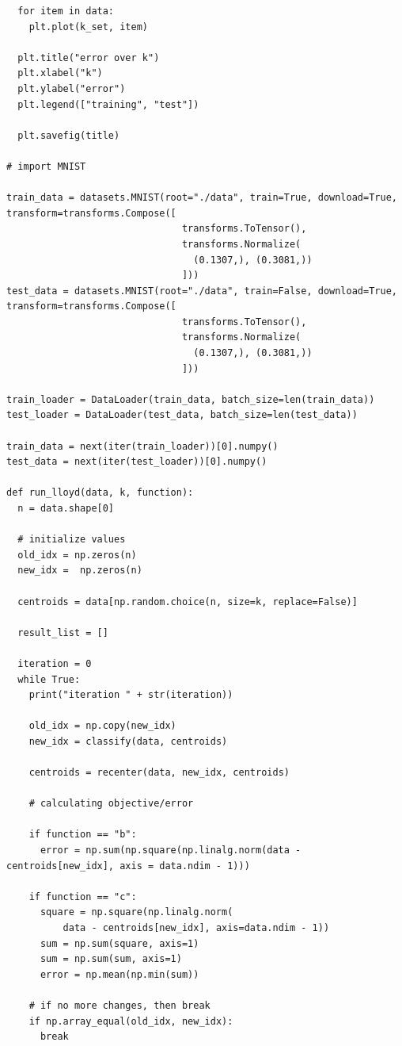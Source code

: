 \documentclass{article}
\newcommand{\1}{\mathbf{1}}
\begin{document}
{\begin{verbatim}
  for item in data:
    plt.plot(k_set, item)

  plt.title("error over k")
  plt.xlabel("k")
  plt.ylabel("error")
  plt.legend(["training", "test"])

  plt.savefig(title)

# import MNIST

train_data = datasets.MNIST(root="./data", train=True, download=True, transform=transforms.Compose([
                               transforms.ToTensor(),
                               transforms.Normalize(
                                 (0.1307,), (0.3081,))
                               ]))
test_data = datasets.MNIST(root="./data", train=False, download=True, transform=transforms.Compose([
                               transforms.ToTensor(),
                               transforms.Normalize(
                                 (0.1307,), (0.3081,))
                               ]))

train_loader = DataLoader(train_data, batch_size=len(train_data))
test_loader = DataLoader(test_data, batch_size=len(test_data))

train_data = next(iter(train_loader))[0].numpy()
test_data = next(iter(test_loader))[0].numpy()

def run_lloyd(data, k, function):
  n = data.shape[0]

  # initialize values
  old_idx = np.zeros(n)
  new_idx =  np.zeros(n)

  centroids = data[np.random.choice(n, size=k, replace=False)]

  result_list = []

  iteration = 0
  while True:
    print("iteration " + str(iteration))

    old_idx = np.copy(new_idx)
    new_idx = classify(data, centroids)

    centroids = recenter(data, new_idx, centroids)

    # calculating objective/error  

    if function == "b":
      error = np.sum(np.square(np.linalg.norm(data - centroids[new_idx], axis = data.ndim - 1)))

    if function == "c":
      square = np.square(np.linalg.norm(
          data - centroids[new_idx], axis=data.ndim - 1))
      sum = np.sum(square, axis=1)
      sum = np.sum(sum, axis=1)
      error = np.mean(np.min(sum))

    # if no more changes, then break
    if np.array_equal(old_idx, new_idx):
      break


\end{verbatim}}
\end{document}
